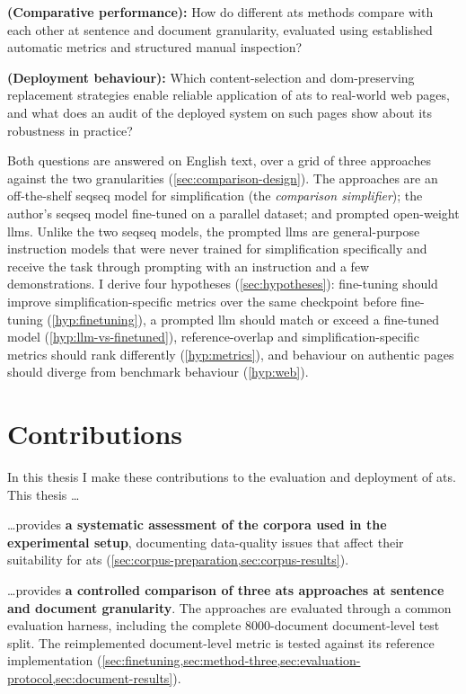 \begin{researchquestions}
	\item\label{rq:comparison} \textbf{(Comparative performance):} How do different \gls{ats} methods compare with each other at sentence and document granularity, evaluated using established automatic metrics and structured manual inspection?
	\item\label{rq:deployment} \textbf{(Deployment behaviour):} Which content-selection and \gls{dom}-preserving replacement strategies enable reliable application of \gls{ats} to real-world web pages, and what does an audit of the deployed system on such pages show about its robustness in practice?
\end{researchquestions}

Both questions are answered on English text, over a grid of three approaches against the two granularities (\cref{sec:comparison-design}).
The approaches are an off-the-shelf \gls{seqseq} model for simplification (the \emph{comparison simplifier}); the author's \gls{seqseq} model fine-tuned on a parallel dataset; and prompted open-weight \glspl{llm}.
Unlike the two \gls{seqseq} models, the prompted \glspl{llm} are general-purpose instruction models that were never trained for simplification specifically and receive the task through prompting with an instruction and a few demonstrations.
I derive four hypotheses (\cref{sec:hypotheses}): fine-tuning should improve simplification-specific metrics over the same checkpoint before fine-tuning (\cref{hyp:finetuning}), a prompted \gls{llm} should match or exceed a fine-tuned model (\cref{hyp:llm-vs-finetuned}), reference-overlap and simplification-specific metrics should rank differently (\cref{hyp:metrics}), and behaviour on authentic pages should diverge from benchmark behaviour (\cref{hyp:web}).

\section{Contributions}
\label{sec:contributions}

In this thesis I make these contributions to the evaluation and deployment of \gls{ats}.
This thesis \dots

\dots provides \textbf{a systematic assessment of the corpora used in the experimental setup}, documenting data-quality issues that affect their suitability for \gls{ats} (\cref{sec:corpus-preparation,sec:corpus-results}).

\dots provides \textbf{a controlled comparison of three \gls{ats} approaches at sentence and document granularity}.
The approaches are evaluated through a common evaluation harness, including the complete \num{8000}-document document-level test split.
The reimplemented document-level metric is tested against its reference implementation (\cref{sec:finetuning,sec:method-three,sec:evaluation-protocol,sec:document-results}).

